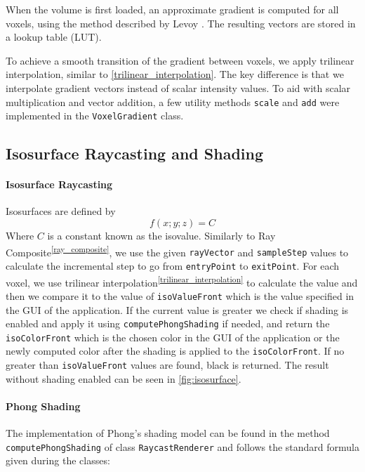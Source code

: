 \documentclass[a4paper]{article}
\begin{document}
\noindent When the volume is first loaded, an approximate gradient is computed for all voxels, using the method described by Levoy \citep{levoy_1988}. The resulting vectors are stored in a lookup table (LUT).

To achieve a smooth transition of the gradient between voxels, we apply trilinear interpolation, similar to \autoref{trilinear_interpolation}. The key difference is that we interpolate gradient vectors instead of scalar intensity values. To aid with scalar multiplication and vector addition, a few utility methods {\tt scale} and {\tt add} were implemented in the {\tt VoxelGradient} class.

\subsection{Isosurface Raycasting and Shading}

\paragraph{Isosurface Raycasting}
\label{isosurface}

Isosurfaces are defined by
 $$f(x; y; z) = C$$ 
Where $C$ is a constant known as the isovalue. Similarly to Ray Composite\textsuperscript{\autoref{ray_composite}}, we use the given {\tt rayVector} and {\tt sampleStep} values to calculate the incremental step to go from {\tt entryPoint} to {\tt exitPoint}. For each voxel, we use trilinear interpolation\textsuperscript{\autoref{trilinear_interpolation}} to calculate the value and then we compare it to the value of {\tt isoValueFront} which is the value specified in the GUI of the application. If the current value is greater we check if shading is enabled and apply it using {\tt computePhongShading} if needed, and return the {\tt isoColorFront} which is the chosen color in the GUI of the application or the newly computed color after the shading is applied to the  {\tt isoColorFront}. If no greater than {\tt isoValueFront} values are found, black is returned. The result without shading enabled can be seen in \autoref{fig:isosurface}.

\paragraph{Phong Shading}

The implementation of Phong's shading model can be found in the method {\tt computePhongShading} of class {\tt RaycastRenderer} and follows the standard formula given during the classes:
\end{document}
